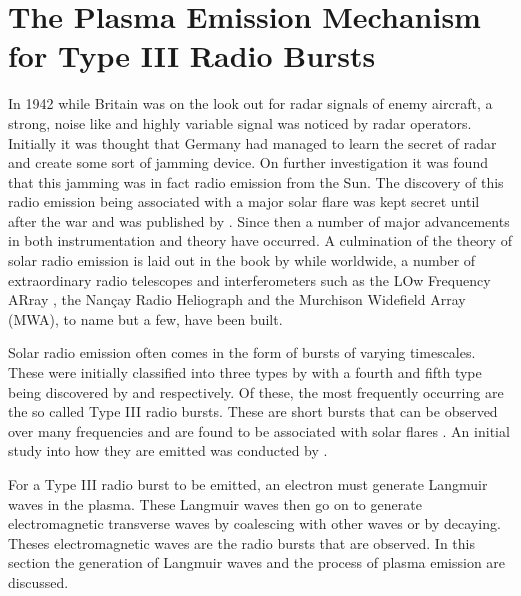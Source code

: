 \section{The Plasma Emission Mechanism for Type III Radio Bursts}
\label{sec:plasma}
In 1942 while Britain was on the look out for radar signals of enemy aircraft, a strong, noise like and highly variable signal was noticed by radar operators. Initially it was thought that Germany had managed to learn the secret of radar and create some sort of jamming device. On further investigation it was found that this jamming was in fact radio emission from the Sun. The discovery of this radio emission being associated with a major solar flare was kept secret until after the war and was published by \cite{Appleton1946}.
Since then a number of major advancements in both instrumentation and theory have occurred. A culmination of the theory of solar radio emission is laid out in the book by \cite{McLean1985} while worldwide, a number of extraordinary radio telescopes and interferometers such as the LOw Frequency ARray \cite[LOFAR,][]{VanHaarlem2013}, the Nan\c{c}ay Radio Heliograph and the Murchison Widefield Array (MWA), to name but a few, have been built.

Solar radio emission often comes in the form of bursts of varying timescales. These were initially classified into three types by \cite{Wild1950b} with a fourth and fifth type being discovered by \cite{Boischot1957} and \cite{Wild1959} respectively. Of these, the most frequently occurring are the so called Type III radio bursts. These are short bursts that can be observed over many frequencies and are found to be associated with solar flares \citep{Malville1962}. An initial study into how they are emitted was conducted by \cite{Ginzburg1958}.%

For a Type III radio burst to be emitted, an electron must generate Langmuir waves in the plasma. These Langmuir waves then go on to generate electromagnetic transverse waves by coalescing with other waves or by decaying. Theses electromagnetic waves are the radio bursts that are observed. In this section the generation of Langmuir waves and the process of plasma emission are discussed.

